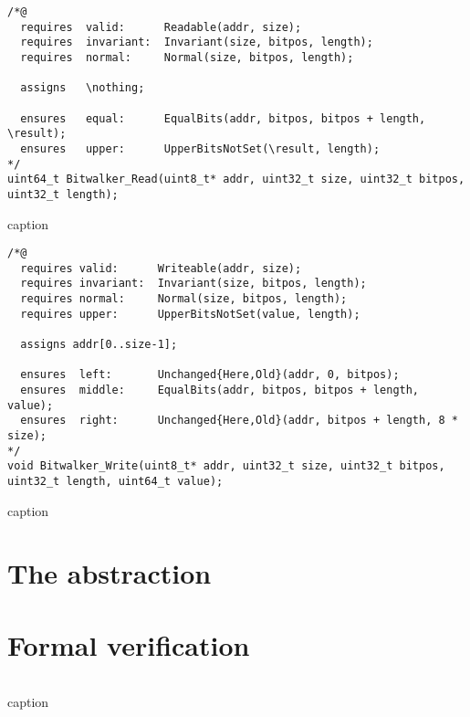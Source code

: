 \begin{listing}[hbt]
\begin{minipage}{0.99\textwidth}
\begin{lstlisting}[style=acsl-block]
/*@
  requires  valid:      Readable(addr, size);
  requires  invariant:  Invariant(size, bitpos, length);
  requires  normal:     Normal(size, bitpos, length);

  assigns   \nothing;

  ensures   equal:      EqualBits(addr, bitpos, bitpos + length, \result);
  ensures   upper:      UpperBitsNotSet(\result, length);
*/
uint64_t Bitwalker_Read(uint8_t* addr, uint32_t size, uint32_t bitpos, uint32_t length);
\end{lstlisting}
\end{minipage}
\caption{caption}
\end{listing}

\begin{listing}[hbt]
\begin{minipage}{0.99\textwidth}
\begin{lstlisting}[style=acsl-block]
/*@
  requires valid:      Writeable(addr, size);
  requires invariant:  Invariant(size, bitpos, length);
  requires normal:     Normal(size, bitpos, length);
  requires upper:      UpperBitsNotSet(value, length);

  assigns addr[0..size-1];

  ensures  left:       Unchanged{Here,Old}(addr, 0, bitpos);
  ensures  middle:     EqualBits(addr, bitpos, bitpos + length, value);
  ensures  right:      Unchanged{Here,Old}(addr, bitpos + length, 8 * size);
*/
void Bitwalker_Write(uint8_t* addr, uint32_t size, uint32_t bitpos, uint32_t length, uint64_t value);
\end{lstlisting}
\end{minipage}
\caption{caption}
\end{listing}



\FloatBarrier

\section{The  abstraction}

\section{Formal verification}


\begin{listing}[hbt]
\begin{minipage}{0.99\textwidth}
\begin{lstlisting}[style=acsl-block]

\end{lstlisting}
\end{minipage}
\caption{caption}
\end{listing}

